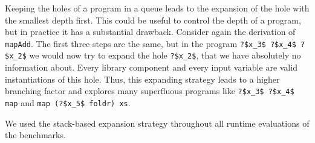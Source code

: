 Keeping the holes of a program in a queue leads to the expansion of the hole with the smallest depth first. This could be useful to control the depth of a program, but in practice it has a substantial drawback. Consider again the derivation of \lstinline?mapAdd?. The first three steps are the same, but in the program \lstinline!?$x_3$ ?$x_4$ ?$x_2$! we would now try to expand the hole \lstinline!?$x_2$!, that we have absolutely no information about. Every library component and every input variable are valid instantiations of this hole. Thus, this expanding strategy leads to a higher branching factor and explores many superfluous programs like \lstinline!?$x_3$ ?$x_4$ map! and \lstinline!map (?$x_5$ foldr) xs!.

We used the stack-based expansion strategy throughout all runtime evaluations of the benchmarks.


